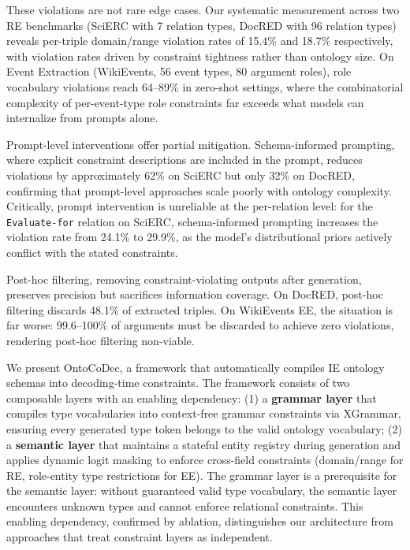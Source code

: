 \documentclass[11pt,a4paper]{article}
\newcommand{\sys}{OntoCoDec}
\begin{document}
These violations are not rare edge cases. Our systematic measurement across two RE benchmarks (SciERC with 7 relation types, DocRED with 96 relation types) reveals per-triple domain/range violation rates of 15.4\% and 18.7\% respectively, with violation rates driven by constraint tightness rather than ontology size. On Event Extraction (WikiEvents, 56 event types, 80 argument roles), role vocabulary violations reach 64--89\% in zero-shot settings, where the combinatorial complexity of per-event-type role constraints far exceeds what models can internalize from prompts alone.

Prompt-level interventions offer partial mitigation. Schema-informed prompting, where explicit constraint descriptions are included in the prompt, reduces violations by approximately 62\% on SciERC but only 32\% on DocRED, confirming that prompt-level approaches scale poorly with ontology complexity. Critically, prompt intervention is unreliable at the per-relation level: for the \texttt{Evaluate-for} relation on SciERC, schema-informed prompting increases the violation rate from 24.1\% to 29.9\%, as the model's distributional priors actively conflict with the stated constraints.

Post-hoc filtering, removing constraint-violating outputs after generation, preserves precision but sacrifices information coverage. On DocRED, post-hoc filtering discards 48.1\% of extracted triples. On WikiEvents EE, the situation is far worse: 99.6--100\% of arguments must be discarded to achieve zero violations, rendering post-hoc filtering non-viable.

We present \sys{}, a framework that automatically compiles IE ontology schemas into decoding-time constraints. The framework consists of two composable layers with an enabling dependency:
(1) a \textbf{grammar layer} that compiles type vocabularies into context-free grammar constraints via XGrammar, ensuring every generated type token belongs to the valid ontology vocabulary;
(2) a \textbf{semantic layer} that maintains a stateful entity registry during generation and applies dynamic logit masking to enforce cross-field constraints (domain/range for RE, role-entity type restrictions for EE).
The grammar layer is a prerequisite for the semantic layer: without guaranteed valid type vocabulary, the semantic layer encounters unknown types and cannot enforce relational constraints. This enabling dependency, confirmed by ablation, distinguishes our architecture from approaches that treat constraint layers as independent.
\end{document}
